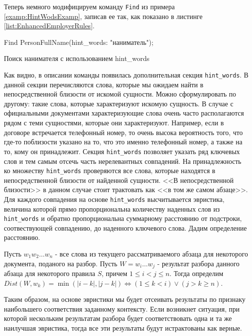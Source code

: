 Теперь немного модифицируем команду \lstinline{Find} из примера \ref{examp:HintWodsExamp}, записав ее так, как показано в листинге \ref{list:EnhancedEmployerRules}.
\begin{ListingEnv}
\begin{Verb}

Find PersonFullName(hint_words: "наниматель");
\end{Verb}
\caption{Поиск нанимателя с использованием hint\_words}
\label{list:EnhancedEmployerRules}
\end{ListingEnv}
Как видно, в описании команды появилась дополнительная секция \lstinline{hint_words}. В данной секции перечисляются слова, которые мы ожидаем найти в непосредственной близости от искомой сущности. Можно сформулировать по другому: такие слова, которые характеризуют искомую сущность. В случае с официальными документами характеризующие слова очень часто располагаются рядом с теми сущностями, которые они характеризуют. Например, если в договоре встречается телефонный номер, то очень высока вероятность того, что где-то поблизости указано на то, что это именно телефонный номер, а также на то, кому он принадлежит. Секция \lstinline{hint_words} позволяет указать ряд ключевых слов и тем самым отсечь часть нерелевантных совпадений. На принадлежность ко множеству \lstinline{hint_words} проверяются все слова, которые находятся в непосредственной близости от найденной сущности. <<В непосредственной близости>> в данном случае стоит трактовать как <<в том же самом абзаце>>. Для каждого совпадения на основе \lstinline{hint_words} высчитывается эвристика, величина которой прямо пропорциональна количеству наденных слов из \lstinline{hint_words} и обратно пропорциональна суммарному расстоянию от подстроки, соотвествующей совпадению, до наденного ключевого слова. Дадим определение расстоянию.
\begin{mydefinition}
Пусть $w_1 w_2 \dots w_n$ - все слова из текущего рассматриваемого абзаца для некоторого документа, поданого на разбор. Пусть  $W = w_i \dots w_j$ - результат разбора данного абзаца для некоторого правила $S$, причем $1 \leq i < j \leq n$. Тогда определим $Dist(W, w_k) = \min(|i - k|, |j - k|) \iff (1 \leq k < i) \lor (j > k \geq n)$.
\end{mydefinition}
Таким образом, на основе эвристики мы будет отсеивать результаты по признаку наибольшего соответствия заданному контексту. Если возникнет ситуация, при которой нескольким результатам разбора будет соответствовать одна и та же наилучшая эвристика, тогда все эти результаты будут истрактованы как верные.

